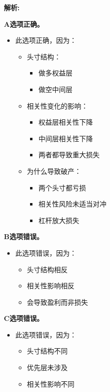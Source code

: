 \documentclass{article}
\newenvironment{explanation}
{\textbf{解析:}\par}
{\par}
\begin{document}
\begin{explanation}
    \textbf{A选项正确。}
    \begin{itemize}
        \item 此选项正确，因为：
        \begin{itemize}
            \item 头寸结构：
            \begin{itemize}
                \item 做多权益层
                \item 做空中间层
            \end{itemize}
            \item 相关性变化的影响：
            \begin{itemize}
                \item 权益层相关性下降
                \item 中间层相关性下降
                \item 两者都导致重大损失
            \end{itemize}
            \item 为什么导致破产：
            \begin{itemize}
                \item 两个头寸都亏损
                \item 相关性风险未适当对冲
                \item 杠杆放大损失
            \end{itemize}
        \end{itemize}
    \end{itemize}
    \textbf{B选项错误。}
    \begin{itemize}
        \item 此选项错误，因为：
        \begin{itemize}
            \item 头寸结构相反
            \item 相关性影响相反
            \item 会导致盈利而非损失
        \end{itemize}
    \end{itemize}
    \textbf{C选项错误。}
    \begin{itemize}
        \item 此选项错误，因为：
        \begin{itemize}
            \item 头寸结构不同
            \item 优先层未涉及
            \item 相关性影响不同

\end{itemize}
\end{itemize}
\end{explanation}
\end{document}
